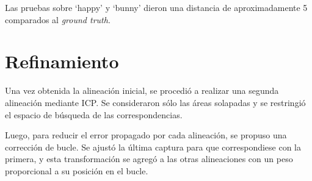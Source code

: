 	Las pruebas sobre `happy' y `bunny' dieron una distancia de aproximadamente
	5 %
	comparados al \emph{ground truth}.


	\section{Refinamiento}
	Una vez obtenida la alineación inicial, se procedió a realizar una segunda
	alineación mediante ICP.
	Se consideraron sólo las áreas solapadas y se restringió el
	espacio de búsqueda de las correspondencias.

	Luego, para reducir el error propagado por cada alineación, se propuso una
	corrección de bucle.
	Se ajustó la última captura para que correspondiese con la primera, y
	esta transformación se agregó a las otras alineaciones con un peso
	proporcional a su posición en el bucle.




